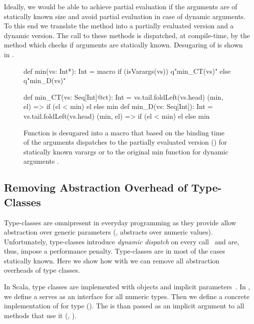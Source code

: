 Ideally, we would be able to achieve partial evaluation if the arguments are of statically
known size and avoid partial evaluation in case of dynamic arguments. To this end we translate
the method  into a partially evaluated version and a dynamic version. The call to these
methods is dispatched, at compile-time, by the  method which checks if
arguments are statically known. Desugaring of  is shown in .

\begin{figure}
\begin{listing}
def min(vs: Int*): Int = macro
  if (isVarargs(vs)) q"min_CT(vs)"
  else q"min_D(vs)"

def min_CT(vs: Seq[Int]@ct): Int =
  vs.tail.foldLeft(vs.head) { (min, el) =>
  if (el < min) el else min
}
def min_D(vs: Seq[Int]): Int =
  vs.tail.foldLeft(vs.head) {
    (min, el) => if (el < min) el else min
  }
\end{listing}
\caption{Function  is desugared into a  macro that based on the
binding time of the arguments dispatches to the partially evaluated version ()
for statically known varargs or to the original min function for dynamic arguments .}
\label{fig:min}
\end{figure}

\subsection{Removing Abstraction Overhead of Type-Classes}
\label{sct:type-classes-removal}

Type-classes are omnipresent in everyday programming as they provide allow abstraction over
 generic parameters (\eg,  abstracts over numeric values). Unfortunately,
 type-classes introduce \emph{dynamic dispatch} on every call~\cite{rompf_optimizing_2013} and are,
 thus, impose a performance penalty. Type-classes are in most of the cases statically known. Here
 we show how with \tool we can remove all abstraction overheads of type classes.

In Scala, type classes are implemented with objects and implicit parameters~\cite{oliveira_type_2010}.
In , we define a  serves as an interface for
all numeric types. Then we define a concrete implementation of  for
type  (). The  is than passed
as an implicit argument  to all methods that use it (\eg, ).

